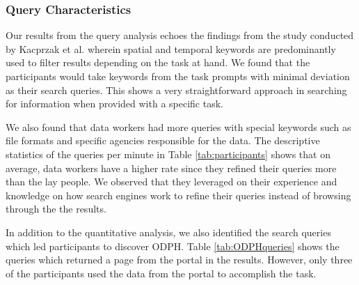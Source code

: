 \documentclass{sigchi}
\begin{document}

\subsubsection{Query Characteristics}
Our results from the query analysis echoes the findings from the study conducted by Kacprzak et al. \cite{kacprzak2019characterising} wherein spatial and temporal keywords are predominantly used to filter results depending on the task at hand. We found that the participants would take keywords from the task prompts with minimal deviation as their search queries. This shows a very straightforward approach in searching for information when provided with a specific task.

We also found that data workers had more queries with special keywords such as file formats and specific agencies responsible for the data. The descriptive statistics of the queries per minute in Table \ref{tab:participants} shows that on average, data workers have a higher rate since they refined their queries more than the lay people. We observed that they leveraged on their experience and knowledge on how search engines work to refine their queries instead of browsing through the the results.

In addition to the quantitative analysis, we also identified the search queries which led participants to discover ODPH. Table \ref{tab:ODPHqueries} shows the queries which returned a page from the portal in the results. However, only three of the participants used the data from the portal to accomplish the task.

\end{document}
